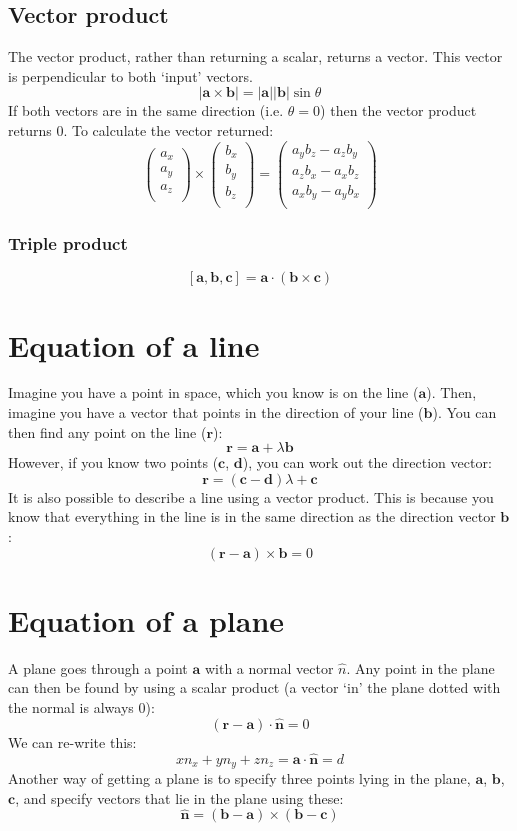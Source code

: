 \subsection{Vector product}
The vector product, rather than returning a scalar, returns a vector. This
vector is perpendicular to both `input' vectors.
$$
	|\bm{a} \times \bm{b}| = |\bm{a}||\bm{b}|\sin\theta
$$
If both vectors are in the same direction (i.e. $\theta=0$) then the vector
product returns 0. To calculate the vector returned:
$$
	\begin{pmatrix}
	a_x\\
	a_y\\
	a_z\\
	\end{pmatrix}
	\times
	\begin{pmatrix}
	b_x\\
	b_y\\
	b_z\\
	\end{pmatrix}
	=
	\begin{pmatrix}
	a_y b_z - a_z b_y\\
	a_z b_x - a_x b_z\\
	a_x b_y - a_y b_x\\
	\end{pmatrix}
$$

\subsubsection{Triple product}
$$
	[\bm{a},\bm{b},\bm{c}] = \bm{a} \cdot (\bm{b} \times \bm{c})
$$

\section{Equation of a line}
Imagine you have a point in space, which you know is on the line ($\bm{a}$).
Then, imagine you have a vector that points in the direction of your line
($\bm{b}$). You can then find any point on the line ($\bm{r}$):
$$
	\bm{r} = \bm{a} + \lambda\bm{b}
$$
However, if you know two points ($\bm{c}$, $\bm{d}$), you can work out the
direction vector:
$$
	\bm{r} = (\bm{c} - \bm{d})\lambda + \bm{c}
$$
It is also possible to describe a line using a vector product. This is because
you know that everything in the line is in the same direction as the direction
vector $\bm{b}$:
$$
	(\bm{r} - \bm{a})\times\bm{b} = 0
$$

\section{Equation of a plane}
A plane goes through a point $\bm{a}$ with a normal vector $\hat{n}$. Any point
in the plane can then be found by using a scalar product (a vector `in' the
plane dotted with the normal is always 0):
$$
	(\bm{r} - \bm{a})\cdot\hat{\bm{n}} = 0
$$
We can re-write this:
$$
	xn_x + yn_y + zn_z = \bm{a}\cdot\hat{\bm{n}} = d
$$
Another way of getting a plane is to specify three points lying in the plane,
$\bm{a}$, $\bm{b}$, $\bm{c}$, and specify vectors that lie in the plane using
these:
$$
	\hat{\bm{n}} = (\bm{b} - \bm{a}) \times (\bm{b} - \bm{c})
$$

